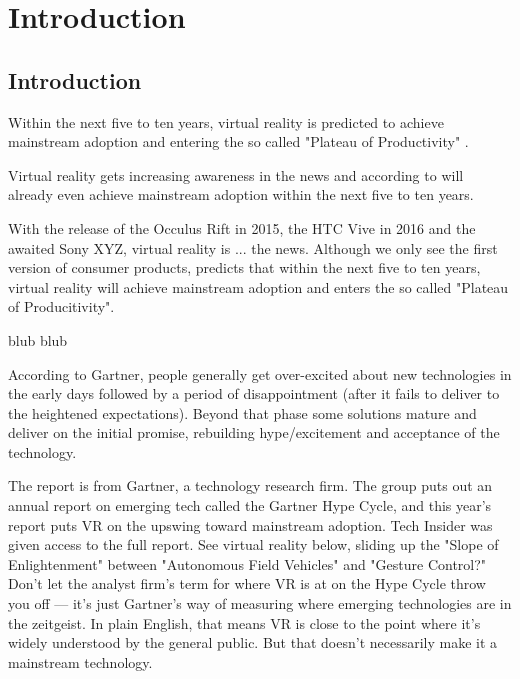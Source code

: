 
\chapter{Introduction} %

\label{ChapterIntroduction} %


\section{Introduction}

Within the next five to ten years, virtual reality is predicted to achieve mainstream adoption and entering the so called "Plateau of Productivity" \citep{gartner2015}.

Virtual reality gets increasing awareness in the news and according to \cite{gartner2015} will already even achieve mainstream adoption within the next five to ten years.

With the release of the Occulus Rift in 2015, the HTC Vive in 2016 and the awaited Sony XYZ, virtual reality is ... the news. Although we only see the first version of consumer products, \cite{gartner2015} predicts that within the next five to ten years, virtual reality will achieve mainstream adoption and enters the so called "Plateau of Producitivity".

blub
\cite{safrudin2015}
blub


According to Gartner, people generally get over-excited about new technologies in the early days followed by a period of disappointment (after it fails to deliver to the heightened expectations). Beyond that phase some solutions mature and deliver on the initial promise, rebuilding hype/excitement and acceptance of the technology.


 The report is from Gartner, a technology research firm. The group puts out an annual report on emerging tech called the Gartner Hype Cycle, and this year's report puts VR on the upswing toward mainstream adoption. Tech Insider was given access to the full report.
 See virtual reality below, sliding up the "Slope of Enlightenment" between "Autonomous Field Vehicles" and "Gesture Control?" Don't let the analyst firm's term for where VR is at on the Hype Cycle throw you off — it's just Gartner's way of measuring where emerging technologies are in the zeitgeist.
 In plain English, that means VR is close to the point where it's widely understood by the general public. But that doesn't necessarily make it a mainstream technology. 

